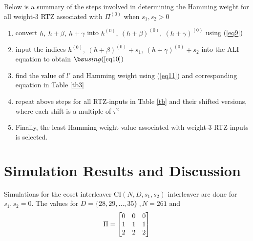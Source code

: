 \documentclass[11pt, oneside, dvipdfmx]{book}
\begin{document}
  Below is a summary of the steps involved in determining the Hamming weight for all weight-$3$ RTZ associated with $\Pi^{(0)}$ when $s_1,s_2>0$
 \begin{enumerate}
 \item convert  $h,~h+\beta,~h+\gamma$ into $h^{(0)},~(h+\beta)^{(0)},~(h+\gamma)^{(0)}$ using (\ref{eq9})
 
 \item input the indices $h^{(0)},~(h+\beta)^{(0)}+s_1,~(h+\gamma)^{(0)}+s_2$
 into the ALI equation to obtain $\bs using (\ref{eq10})$
 
 \item find the value of $l'$ and  Hamming weight using (\ref{eq11}) and corresponding equation in Table \ref{tb3}
 
 \item repeat above steps for all RTZ-inputs in Table \ref{tb} and their shifted versions, where each shift is a multiple of $\tau^2$
 
\item Finally, the least Hamming weight value associated with weight-$3$ RTZ inputs is selected.
 \end{enumerate}
 



\section{Simulation Results and Discussion}
Simulations for the coset interleaver CI$(N,D,s_1,s_2)$ interleaver are done for $s_1,s_2=0$. The values for $D=\{28,29,...,35\}~,N =261$ and $$\Pi =\begin{bmatrix} 0 & 0 & 0 \cr 1 & 1 & 1 \cr 2 & 2 & 2\end{bmatrix}$$
\end{document}
